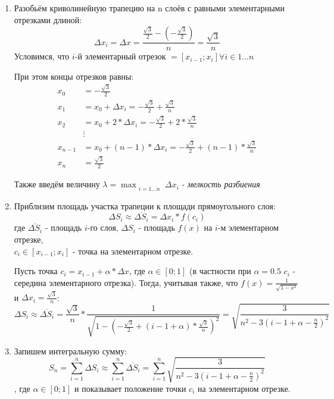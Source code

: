 \documentclass[12pt, a4paper]{article}
\begin{document}
\begin{enumerate}
\item Разобьём криволинейную трапецию на n слоёв с равными элементарными отрезками длиной:
\begin{equation*}
\Delta x_i = \Delta x = \frac{\frac{\sqrt{3}}{2} - \left(-\frac{\sqrt{3}}{2} \right)}{n} = \frac{\sqrt{3}}{n}
\end{equation*}
Условимся, что $i$-й элементарный отрезок $ = \left[x_{i-1};x_i\right] \forall i\in 1\ldots n$

При этом концы отрезков равны:
\begin{align*}
   x_{0} &= -\frac{\sqrt{3}}{2} \\
   x_{1} &= x_0 + \Delta x_i = -\frac{\sqrt{3}}{2} + \frac{\sqrt{3}}{n} \\
   x_{2} &= x_0 + 2 * \Delta x_i = -\frac{\sqrt{3}}{2} + 2 * \frac{\sqrt{3}}{n} \\
   &\vdots\\
   x_{n-1} &= x_0 + (n-1) * \Delta x_i = -\frac{\sqrt{3}}{2} + (n-1) * \frac{\sqrt{3}}{n} \\
   x_{n} &= \frac{\sqrt{3}}{2}
\end{align*}


Также введём величину $\lambda = \max_{\substack{i = 1\ldots n}} \Delta x_i$ - \textit{мелкость разбиения}
\item Приблизим площадь участка трапеции к площади прямоугольного слоя:
\begin{equation*}
\Delta S_i \approx\overline{\Delta S_i} = \Delta x_i * f(c_i)
\end{equation*}
где $\overline{\Delta S_i}$ - площадь $i$-го слоя, $\Delta S_i$ - площадь $f(x)$ на $i$-м элементарном отрезке,   \\$c_i\in \left[x_{i-1};x_i\right]$ - точка на элементарном отрезке.

Пусть точка $c_i = x_{i-1} + \alpha * \Delta x$, где $\alpha \in \left[0;1\right]$ (в частности при $\alpha = 0.5$ $c_i$ - середина элементарного отрезка). Тогда, учитывая также, что $f(x) = \frac{1}{\sqrt{1-x^2}}$ и $\Delta x_i = \frac{\sqrt{3}}{n}$:
\begin{equation*}
\Delta S_i \approx\overline{\Delta S_i} =\frac{\sqrt{3}}{n} * \frac{1}{\sqrt{1-\left(-\frac{\sqrt{3}}{2} + \left(i-1 + \alpha\right)*\frac{\sqrt{3}}{n}\right)^2}} = \sqrt{\frac{3}{n^2-3\left(i-1+\alpha-\frac{n}{2}\right)^2}}
\end{equation*}
\item Запишем интегральную сумму:
\begin{equation}
S_n = \sum_{i=1}^{n} \Delta S_i \approx \sum_{i=1}^{n} \overline{\Delta S_i} =\sum_{i=1}^{n}\sqrt{\frac{3}{n^2-3\left(i-1+\alpha-\frac{n}{2}\right)^2}}
\end{equation},
где $\alpha \in \left[0;1\right]$ и показывает положение точки $c_i$ на элементарном отрезке.
\end{enumerate}
\end{document}
